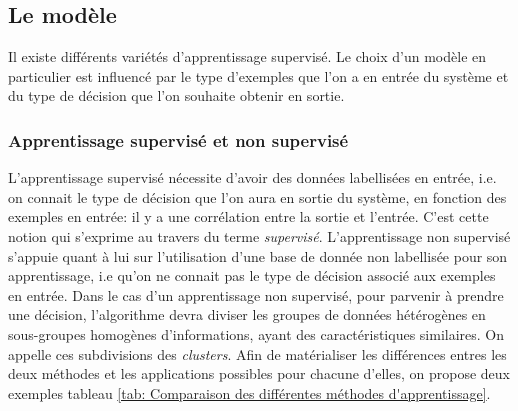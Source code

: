 \subsection{Le modèle}
\label{Le Machine Learning: Généralités sur le Machine Learning: Le modèle}
Il existe différents variétés d'apprentissage supervisé. Le choix d'un modèle en particulier est influencé par le type d'exemples que l'on a en entrée du système et du type de décision que l'on souhaite obtenir en sortie.

\subsubsection{Apprentissage supervisé et non supervisé} 
\label{Le Machine Learning: Généralités sur le Machine Learning: Le modèle: apprentissage supervisé et non supervisé}
L'apprentissage supervisé nécessite d'avoir des données labellisées en entrée, i.e. on connait le type de décision que l'on aura en sortie du système, en fonction des exemples en entrée: il y a une corrélation entre la sortie et l'entrée. C'est cette notion qui s'exprime au travers du terme \emph{supervisé}. 
L'apprentissage non supervisé s'appuie quant à lui sur l'utilisation d'une base de donnée non labellisée pour son apprentissage, i.e qu'on ne connait pas le type de décision associé aux exemples en entrée. Dans le cas d'un apprentissage non supervisé, pour parvenir à prendre une décision, l'algorithme devra diviser les groupes de données hétérogènes en sous-groupes homogènes d'informations, ayant des caractéristiques similaires. On appelle ces subdivisions des \emph{clusters}.
Afin de matérialiser les différences entres les deux méthodes et les applications possibles pour chacune d'elles, on propose deux exemples tableau \ref {tab: Comparaison des différentes méthodes d'apprentissage}.

